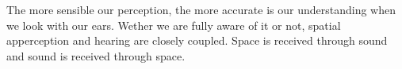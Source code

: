 The more sensible our perception, the more accurate is our understanding when we look with our ears. Wether we are fully aware of it or not, spatial apperception and hearing are closely coupled. Space is received through sound and sound is received through space.




